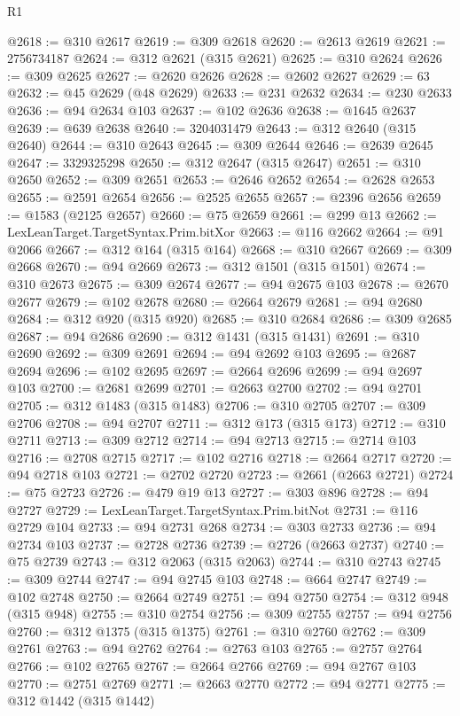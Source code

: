 \begin{lexlean}{R1}
\begin{coremodule}
@2618 := @310 @2617
@2619 := @309 @2618
@2620 := @2613 @2619
@2621 := 2756734187
@2624 := @312 @2621 (@315 @2621)
@2625 := @310 @2624
@2626 := @309 @2625
@2627 := @2620 @2626
@2628 := @2602 @2627
@2629 := 63
@2632 := @45 @2629 (@48 @2629)
@2633 := @231 @2632
@2634 := @230 @2633
@2636 := @94 @2634 @103
@2637 := @102 @2636
@2638 := @1645 @2637
@2639 := @639 @2638
@2640 := 3204031479
@2643 := @312 @2640 (@315 @2640)
@2644 := @310 @2643
@2645 := @309 @2644
@2646 := @2639 @2645
@2647 := 3329325298
@2650 := @312 @2647 (@315 @2647)
@2651 := @310 @2650
@2652 := @309 @2651
@2653 := @2646 @2652
@2654 := @2628 @2653
@2655 := @2591 @2654
@2656 := @2525 @2655
@2657 := @2396 @2656
@2659 := @1583 (@2125 @2657)
@2660 := @75 @2659
@2661 := @299 @13
@2662 := LexLeanTarget.TargetSyntax.Prim.bitXor
@2663 := @116 @2662
@2664 := @91 @2066
@2667 := @312 @164 (@315 @164)
@2668 := @310 @2667
@2669 := @309 @2668
@2670 := @94 @2669
@2673 := @312 @1501 (@315 @1501)
@2674 := @310 @2673
@2675 := @309 @2674
@2677 := @94 @2675 @103
@2678 := @2670 @2677
@2679 := @102 @2678
@2680 := @2664 @2679
@2681 := @94 @2680
@2684 := @312 @920 (@315 @920)
@2685 := @310 @2684
@2686 := @309 @2685
@2687 := @94 @2686
@2690 := @312 @1431 (@315 @1431)
@2691 := @310 @2690
@2692 := @309 @2691
@2694 := @94 @2692 @103
@2695 := @2687 @2694
@2696 := @102 @2695
@2697 := @2664 @2696
@2699 := @94 @2697 @103
@2700 := @2681 @2699
@2701 := @2663 @2700
@2702 := @94 @2701
@2705 := @312 @1483 (@315 @1483)
@2706 := @310 @2705
@2707 := @309 @2706
@2708 := @94 @2707
@2711 := @312 @173 (@315 @173)
@2712 := @310 @2711
@2713 := @309 @2712
@2714 := @94 @2713
@2715 := @2714 @103
@2716 := @2708 @2715
@2717 := @102 @2716
@2718 := @2664 @2717
@2720 := @94 @2718 @103
@2721 := @2702 @2720
@2723 := @2661 (@2663 @2721)
@2724 := @75 @2723
@2726 := @479 @19 @13
@2727 := @303 @896
@2728 := @94 @2727
@2729 := LexLeanTarget.TargetSyntax.Prim.bitNot
@2731 := @116 @2729 @104
@2733 := @94 @2731 @268
@2734 := @303 @2733
@2736 := @94 @2734 @103
@2737 := @2728 @2736
@2739 := @2726 (@2663 @2737)
@2740 := @75 @2739
@2743 := @312 @2063 (@315 @2063)
@2744 := @310 @2743
@2745 := @309 @2744
@2747 := @94 @2745 @103
@2748 := @664 @2747
@2749 := @102 @2748
@2750 := @2664 @2749
@2751 := @94 @2750
@2754 := @312 @948 (@315 @948)
@2755 := @310 @2754
@2756 := @309 @2755
@2757 := @94 @2756
@2760 := @312 @1375 (@315 @1375)
@2761 := @310 @2760
@2762 := @309 @2761
@2763 := @94 @2762
@2764 := @2763 @103
@2765 := @2757 @2764
@2766 := @102 @2765
@2767 := @2664 @2766
@2769 := @94 @2767 @103
@2770 := @2751 @2769
@2771 := @2663 @2770
@2772 := @94 @2771
@2775 := @312 @1442 (@315 @1442)

\end{coremodule}
\end{lexlean}
